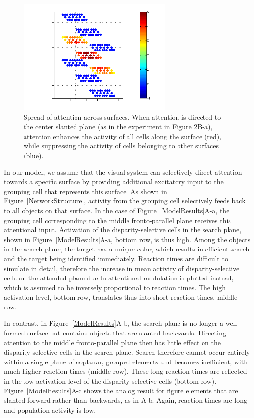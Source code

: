 \begin{figure}[t]
\centering
\includegraphics[width=3in]{3D-Surface/figs/attentionmod}
\makeatletter
\let\@currsize\normalsize
\caption{Spread of attention across surfaces. When attention is directed to the center slanted plane (as in the experiment in Figure 2B-a), attention enhances the activity of all cells along the surface (red), while suppressing the activity of cells belonging to other surfaces (blue).} 
\label{ModelResults2}
\end{figure}

In our model, we assume that the visual system can selectively direct
attention towards a specific surface by providing additional excitatory input to the grouping cell that represents this surface. As shown in Figure~\ref{NetworkStructure}, activity from the grouping cell selectively feeds back to all objects on that surface. In the case of Figure~\ref{ModelResults}A-a, the grouping cell corresponding to the middle fronto-parallel plane receives this attentional input. 
Activation of the disparity-selective cells in the search plane, shown in Figure~\ref{ModelResults}A-a, bottom row, is thus high. Among the objects in the search plane, the target has a unique color, which results in efficient search and the target being identified immediately. Reaction times are difficult to simulate in detail, therefore the increase in mean activity of disparity-selective cells on the attended plane due to attentional modulation is plotted instead,
which is assumed to be inversely proportional to reaction times. The
high activation level, bottom row, translates thus into short reaction
times, middle row.

In contrast, in Figure~\ref{ModelResults}A-b, the search plane is no longer a well-formed surface but contains objects that are slanted
backwards. Directing attention to the middle fronto-parallel plane
then has little effect on the disparity-selective cells in the search
plane. Search therefore cannot occur entirely within a single plane of coplanar, grouped elements and becomes inefficient, with much higher reaction times (middle row). These long reaction times are reflected in the low activation level of the disparity-selective cells (bottom row). Figure~\ref{ModelResults}A-c shows the analog result for figure elements that are slanted forward rather than backwards, as in A-b. Again, reaction times are long and population activity is low. 

